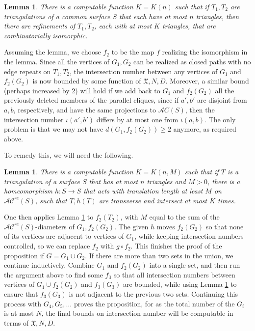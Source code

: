 \documentclass[11pt]{amsart}
\newtheorem{lemma}[theorem]{Lemma}
\theoremstyle{remark}
\numberwithin{equation}{section}
\newcommand{\cAC}{\mathcal{AC}}
\newcommand{\acre}{\cAC^{re}}
\begin{document}
\begin {lemma}\label {lemma1}
There is a computable function	$K=K(n)$  such that if $T_1, T_2 $ are triangulations of a common surface $S$ that each have at most $n$ triangles, then there are refinements of $T_1,T_2$, each with at most $K$ triangles, that are combinatorially isomorphic.\end {lemma}

 Assuming the lemma, we choose $f_2$  to be the map $f$ realizing the isomorphism in the lemma. Since all the vertices of $G_1,G_2$ can be realized as closed paths with no edge repeats on $T_1,T_2$, the intersection number  between any vertices of $G_1$ and $f_2(G_2)$ is now  bounded by some function of $\mathfrak X,N,D$.  Moreover,  a similar bound (perhaps increased by $2$) will hold if we add back to $G_1$ and $f_2(G_2)$ all the previously deleted members of the parallel cliques, since if $a',b'$ are disjoint from $a,b$, respectively, and have the same projections to $\mathcal AC(S)$, then the intersection number $\iota(a',b')$ differs by at most one from $\iota(a,b)$.  The only problem is that we may not have $d(G_1,f_2(G_2)) \geq 2$ anymore, as required above. 

To remedy this, we will need the following.
 
 \begin {lemma}\label {lemma2}
 	There is a computable function	$K=K(n,M)$  such that if $T$ is a triangulation of a surface $S$  that has  at most $n$ triangles and $M > 0$, there is a homeomorphism $h : S \longrightarrow S$  that acts with translation length at least $M$  on $\acre(S)$, such that $T,h(T)$ are transverse and intersect  at most $K$ times.
 \end {lemma}

  One then applies Lemma \ref{lemma2} to $f_2(T_2)$, with $M$ equal to the sum of the $\acre(S)$-diameters of $G_1,f_2(G_2)$. The given $h$ moves $f_2(G_2)$ so that none of its vertices are adjacent to vertices of $G_1$, while keeping intersection numbers  controlled, so we can replace $f_2$ with $g \circ f_2$. This  finishes the proof of the proposition if $G=G_1\cup G_2$. If there are more than two sets in the union, we continue inductively. Combine $G_1$ and $f_2(G_2)$ into a single set, and then run the argument above to find some $f_3$ so that all intersection numbers between  vertices of $G_1 \cup f_2(G_2)$ and $f_3(G_3)$ are bounded, while using Lemma \ref{lemma2} to ensure that $f_3(G_3)$ is not adjacent to the previous two sets.  Continuing this process with $G_4,G_5,\ldots$ proves the proposition, for as the total number of the $G_i$ is at most $N$, the final bounds on intersection number will be computable in terms of $\mathfrak X,N,D$.
\end{document}
